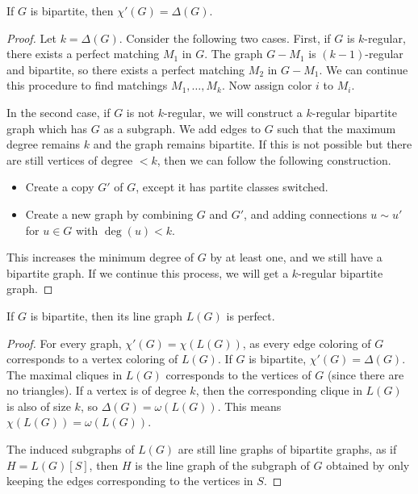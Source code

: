 \begin{theorem}
  If $G$ is bipartite, then $\chi'(G) = \Delta(G)$.
\end{theorem}

\begin{proof}
  Let $k = \Delta(G)$.
  Consider the following two cases.
  First, if $G$ is $k$-regular, there exists a perfect matching $M_1$ in $G$.
  The graph $G - M_1$ is $(k-1)$-regular and bipartite, so there exists a perfect
  matching $M_2$ in $G - M_1$.
  We can continue this procedure to find matchings $M_1, \ldots, M_k$.
  Now assign color $i$ to $M_i$.

  In the second case, if $G$ is not $k$-regular, we will construct a $k$-regular
  bipartite graph which has $G$ as a subgraph.
  We add edges to $G$ such that the maximum degree remains $k$ and the graph
  remains bipartite.
  If this is not possible but there are still vertices of degree $< k$, then we
  can follow the following construction.
  \begin{itemize}
  \item Create a copy $G'$ of $G$, except it has partite classes switched.
  \item Create a new graph by combining $G$ and $G'$, and adding connections $u
	\sim u'$ for $u \in G$ with $\deg(u) < k$.
  \end{itemize}
  This increases the minimum degree of $G$ by at least one, and we still have a
  bipartite graph.
  If we continue this process, we will get a $k$-regular bipartite graph.
\end{proof}


\begin{theorem}
  If $G$ is bipartite, then its line graph $L(G)$ is perfect.
\end{theorem}

\begin{proof}
  For every graph, $\chi'(G) = \chi(L(G))$, as every edge coloring of $G$
  corresponds to a vertex coloring of $L(G)$.
  If $G$ is bipartite, $\chi'(G) = \Delta(G)$.
  The maximal cliques in $L(G)$ corresponds to the vertices of $G$ (since there
  are no triangles).
  If a vertex is of degree $k$, then the corresponding clique in $L(G)$ is also
  of size $k$, so $\Delta(G) = \omega(L(G))$.
  This means $\chi(L(G)) = \omega(L(G))$.

  The induced subgraphs of $L(G)$ are still line graphs of bipartite graphs, as
  if $H = L(G)[S]$, then $H$ is the line graph of the subgraph of $G$ obtained
  by only keeping the edges corresponding to the vertices in $S$.
\end{proof}

